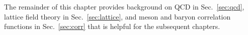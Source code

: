 The remainder of this chapter provides background on QCD in Sec.~\ref{sec:qcd}, lattice field theory in Sec.~\ref{sec:lattice}, and meson and baryon correlation functions in Sec.~\ref{sec:corr} that is helpful for the subsequent chapters.


